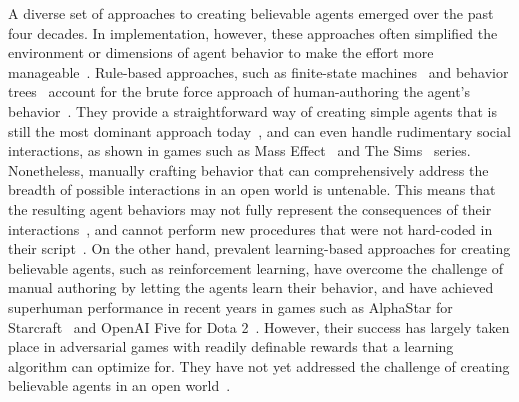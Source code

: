 A diverse set of approaches to creating believable agents emerged over the past four decades.
In implementation, however, these approaches often simplified the environment or dimensions of agent behavior to make the effort more manageable~\cite{23_brooks2000cog, 39_Minsky1970Draft}. Rule-based approaches, such as finite-state machines~\cite{30_NEURIPS2021_86e8f7ab, 32_Umarov2012Believable} and behavior trees~\cite{45_Knafla2011Introduction, 46_Pillosu2009Coordinating, 47_Hecker2011Spore} account for the brute force approach of human-authoring the agent's behavior~\cite{26_mccoy2012prom}. They provide a straightforward way of creating simple agents that is still the most dominant approach today~\cite{37_McCoy2009Comme, 24_miyashita2017developing, 25_yannakakis2012game}, and can even handle rudimentary social interactions, as shown in games such as Mass Effect~\cite{48_BioWare2007Mass} and The Sims~\cite{49_ElectronicArts2009Sims} series. Nonetheless, manually crafting behavior that can comprehensively address the breadth of possible interactions in an open world is untenable. This means that the resulting agent behaviors may not fully represent the consequences of their interactions~\cite{26_mccoy2012prom, 27_mccoy2011prom, 28_mccoy2011comme}, and cannot perform new procedures that were not hard-coded in their script~\cite{30_NEURIPS2021_86e8f7ab, 32_Umarov2012Believable}. On the other hand, prevalent learning-based approaches for creating believable agents, such as reinforcement learning, have overcome the challenge of manual authoring by letting the agents learn their behavior, and have achieved superhuman performance in recent years in games such as AlphaStar for Starcraft~\cite{50_Vinyals2019Grandmaster} and OpenAI Five for Dota 2~\cite{51_Berner2019Dota}. However, their success has largely taken place in adversarial games with readily definable rewards that a learning algorithm can optimize for. They have not yet addressed the challenge of creating believable agents in an open world~\cite{30_NEURIPS2021_86e8f7ab, 24_miyashita2017developing, 38_Hausknecht2020Interactive}.

